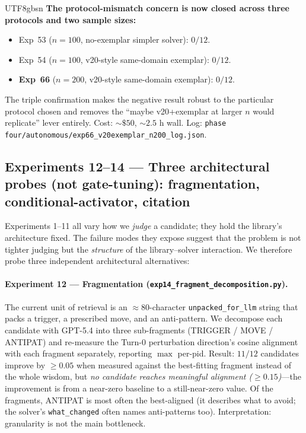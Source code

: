 \documentclass{article}
\begin{document}
\begin{CJK*}{UTF8}{gbsn}
\textbf{The protocol-mismatch concern is now closed across three
protocols and two sample sizes:}
\begin{itemize}[leftmargin=*,topsep=2pt,itemsep=2pt]
  \item Exp~53 (\(n=100\), no-exemplar simpler solver): \(0/12\).
  \item Exp~54 (\(n=100\), v20-style same-domain exemplar): \(0/12\).
  \item \textbf{Exp~66} (\(n=200\), v20-style same-domain exemplar):
    \textbf{\(0/12\)}.
\end{itemize}

The triple confirmation makes the negative result robust to the
particular protocol chosen and removes the ``maybe v20+exemplar
at larger \(n\) would replicate'' lever entirely. Cost:
\(\sim\$50\), \(\sim 2.5\) h wall. Log:
\texttt{phase four/autonomous/exp66\_v20exemplar\_n200\_log.json}.

\subsection{Experiments 12–14 — Three architectural probes (not
gate-tuning): fragmentation, conditional-activator, citation}
\label{sec:arch}

Experiments 1–11 all vary how we \emph{judge} a candidate; they
hold the library's architecture fixed. The failure modes they
expose suggest that the problem is not tighter judging but the
\emph{structure} of the library–solver interaction. We therefore
probe three independent architectural alternatives:

\paragraph{Experiment 12 — Fragmentation
(\texttt{exp14\_fragment\_decomposition.py}).} The current unit of
retrieval is an \(\approx 80\)-character
\texttt{unpacked\_for\_llm} string that packs a trigger, a
prescribed move, and an anti-pattern. We decompose each
candidate with GPT-5.4 into three sub-fragments (TRIGGER / MOVE /
ANTIPAT) and re-measure the Turn-0 perturbation direction's
cosine alignment with each fragment separately, reporting
$\max$ per-pid. Result: \(11/12\) candidates improve by
\(\geq 0.05\) when measured against the best-fitting fragment
instead of the whole wisdom, but \emph{no candidate reaches
meaningful alignment (\(\geq 0.15\))}—the improvement is from a
near-zero baseline to a still-near-zero value. Of the fragments,
ANTIPAT is most often the best-aligned (it describes what to
avoid; the solver's \texttt{what\_changed} often names
anti-patterns too). Interpretation: granularity is not the main
bottleneck.


\end{CJK*}
\end{document}

